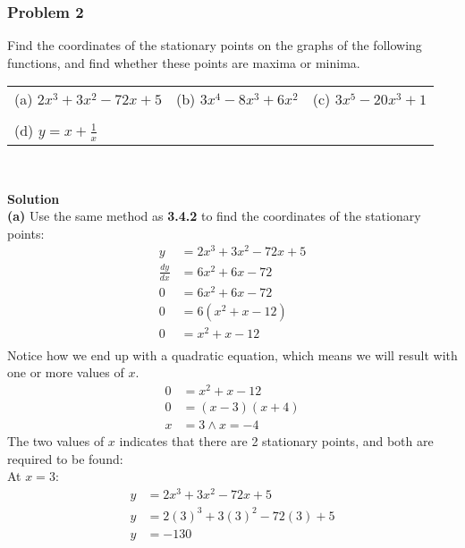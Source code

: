 \documentclass[hidelinks, a4paper, 12pt]{article}
\newcommand{\bd}{\textbf}
\newcommand{\n}{\\[\baselineskip]}
\newcommand{\dydx}{\frac{dy}{dx}}
\begin{document}
            \subsubsection{Problem 2}
                Find the coordinates of the stationary points on the graphs of the following functions, and find whether these points are maxima or minima.
                \begin{center}
                    \begin{tabularx}{\textwidth} {
                        X X X}
                        (a) $2x^3+3x^2-72x+5$ & (b) $3x^4 -8x^3 + 6x^2$ & (c) $3x^5 - 20x^3 +1$\\
                        \\
                        (d) $y = x + \frac{1}{x}$
                    \end{tabularx}\n
                \end{center}
                \bd{Solution}\n
                \bd{(a)} Use the same method as \bd{3.4.2} to find the coordinates of the stationary points:
                \[\begin{split}
                    y &= 2x^3 + 3x^2 - 72x + 5\\
                    \dydx &= 6x^2 + 6x - 72\\
                    0 &= 6x^2 + 6x - 72\\
                    0 &= 6(x^2 + x - 12)\\
                    0 &= x^2 + x - 12\\
                \end{split}\]
                Notice how we end up with a quadratic equation, which means we will result with one or more values of $x$.
                \[\begin{split}
                    0 &= x^2 + x - 12\\
                    0 &= (x-3)(x+4)\\
                    x &= 3 \land x = -4 
                \end{split}\]
                The two values of $x$ indicates that there are 2 stationary points, and both are required to be found:\n
                At $x=3$:
                \[\begin{split}
                    y &= 2x^3 + 3x^2 - 72x + 5\\
                    y &= 2(3)^3 + 3(3)^2 - 72(3) + 5\\
                    y &= -130\\
                \end{split}\]
\end{document}
